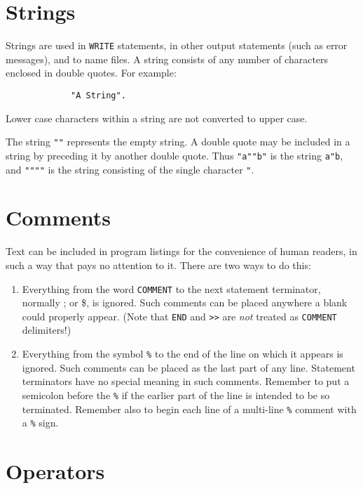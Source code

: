 \section{Strings}

Strings are used in \texttt{WRITE} statements, in other
output statements (such as error messages), and to name files.  A string
consists of any number of characters enclosed in double quotes.  For example:
\begin{verbatim}
             "A String".
\end{verbatim}
Lower case characters within a string are not converted to upper case.

The string \texttt{""} represents the empty string.  A double quote may be
included in a string by preceding it by another double quote.  Thus
\texttt{"a""b"} is the string \texttt{a"b}, and \texttt{""""} is the string
consisting of the single character \texttt{"}.

\hypertarget{comments}{\section{Comments}}

Text can be included in program listings for the
convenience of human readers, in such a way that {\REDUCE} pays no
attention to it.  There are two ways to do this:

\begin{enumerate}
\item Everything from the word \texttt{COMMENT} to the next
statement terminator, normally ; or \$, is ignored.  Such comments
can be placed anywhere a blank could properly appear. (Note that \texttt{END}
and \texttt{>}\texttt{>} are \emph{not} treated as \texttt{COMMENT} delimiters!)

\item Everything from the symbol \texttt{\%}
 to the end
of the line on which it appears is ignored.  Such comments can be placed
as the last part of any line.  Statement terminators have no special
meaning in such comments.  Remember to put a semicolon before the \texttt{\%}
if the earlier part of the line is intended to be so terminated.  Remember
also to begin each line of a multi-line \texttt{\%} comment with a \texttt{\%}
sign.
\end{enumerate}

\section{Operators}
\label{sec-operators}

